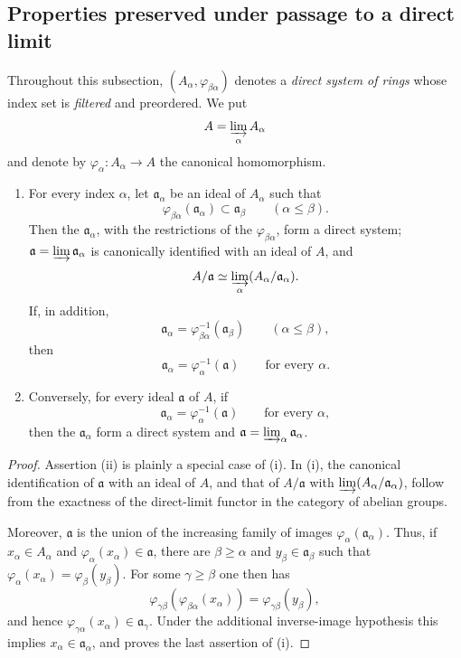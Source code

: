 \subsection{Properties preserved under passage to a direct limit}
\label{subsection:IV.5.13}


Throughout this subsection,
$(A_\alpha,\varphi_{\beta\alpha})$ denotes a \emph{direct system of
rings} whose index set is \emph{filtered} and preordered.  We put
\[
  A=\varinjlim_\alpha A_\alpha
\]
and denote by $\varphi_\alpha:A_\alpha\to A$ the canonical
homomorphism.

\begin{proposition}[5.13.1]
\label{IV.5.13.1}
\begin{enumerate}[{\rm(i)}]
  \item For every index $\alpha$, let $\mathfrak a_\alpha$ be an
  ideal of $A_\alpha$ such that
  \[
    \varphi_{\beta\alpha}(\mathfrak a_\alpha)
    \subset\mathfrak a_\beta
    \qquad(\alpha\leq\beta).
  \]
  Then the $\mathfrak a_\alpha$, with the restrictions of the
  $\varphi_{\beta\alpha}$, form a direct system;
  $\mathfrak a=\varinjlim\mathfrak a_\alpha$ is canonically
  identified with an ideal of $A$, and
  \[
    A/\mathfrak a
    \simeq
    \varinjlim_\alpha(A_\alpha/\mathfrak a_\alpha).
  \]
  If, in addition,
  \[
    \mathfrak a_\alpha
    =\varphi_{\beta\alpha}^{-1}(\mathfrak a_\beta)
    \qquad(\alpha\leq\beta),
  \]
  then
  \[
    \mathfrak a_\alpha=\varphi_\alpha^{-1}(\mathfrak a)
    \qquad\text{for every }\alpha.
  \]

  \item Conversely, for every ideal $\mathfrak a$ of $A$, if
  \[
    \mathfrak a_\alpha=\varphi_\alpha^{-1}(\mathfrak a)
    \qquad\text{for every }\alpha,
  \]
  then the $\mathfrak a_\alpha$ form a direct system and $\mathfrak a=\varinjlim_\alpha\mathfrak a_\alpha$.
\end{enumerate}
\end{proposition}

\begin{proof}
Assertion {\rm(ii)} is plainly a special case of {\rm(i)}.
In {\rm(i)}, the canonical identification of
$\mathfrak a$ with an ideal of $A$, and that of
$A/\mathfrak a$ with
$\varinjlim(A_\alpha/\mathfrak a_\alpha)$, follow from the
exactness of the direct-limit functor in the category of abelian
groups.

Moreover, $\mathfrak a$ is the union of the increasing family of
images $\varphi_\alpha(\mathfrak a_\alpha)$.  Thus, if
$x_\alpha\in A_\alpha$ and
$\varphi_\alpha(x_\alpha)\in\mathfrak a$, there are
$\beta\geq\alpha$ and $y_\beta\in\mathfrak a_\beta$ such that $\varphi_\alpha(x_\alpha)=\varphi_\beta(y_\beta)$.
For some $\gamma\geq\beta$ one then has
\[
  \varphi_{\gamma\beta}(\varphi_{\beta\alpha}(x_\alpha))
  =\varphi_{\gamma\beta}(y_\beta),
\]
and hence $\varphi_{\gamma\alpha}(x_\alpha)\in\mathfrak a_\gamma$.
Under the additional inverse-image hypothesis this implies
$x_\alpha\in\mathfrak a_\alpha$, and proves the last assertion of
{\rm(i)}.
\end{proof}

